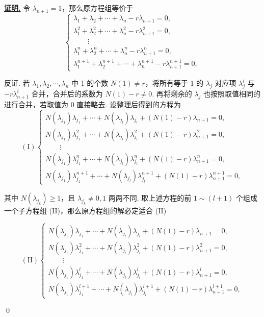 \documentclass[10pt,openany]{article}
\theoremstyle{thmstyle} %
\theoremstyle{defstyle} %
\theoremstyle{prostyle} %
\theoremstyle{exastyle}
\theoremstyle{remstyle}
\renewenvironment{proof}[1][证明]{\par\underline{\textbf{#1.}} \;\fangsong}{\qed\par}
\begin{document}
\begin{proof}
   令 \( \lambda_{n+1}=1 \)，那么原方程组等价于
   \[ \left\{ \begin{array}{l}
   	\lambda_1+\lambda_2+\cdots+\lambda_n-r\lambda_{n+1} = 0,\\
   	\lambda_1^{2}+\lambda_2^{2}+\cdots+\lambda_n^{2}-r\lambda_{n+1}^2 = 0,\\
   	\qquad \vdots\\
   	\lambda_1^{n}+\lambda_2^{n}+\cdots+\lambda_n^{n}-r\lambda_{n+1}^{n} = 0,\\
   	\lambda_1^{n+1}+\lambda_2^{n+1}+\cdots+\lambda_n^{n+1}-r\lambda_{n+1}^{n+1} = 0,
   \end{array}\right.\]
   
   反证. 若 \( \lambda_1,\lambda_2,\cdots,\lambda_n \) 中 1 的个数 \( N(1) \neq r \)，将所有等于 \( 1 \) 的 \( \lambda_j \) 对应项 \( \lambda_j^i \) 与 \( -r\lambda_{n+1}^{i} \) 合并，合并后的系数为 \( N(1)-r \neq 0 \). 再将剩余的 \( \lambda_j \) 也按照取值相同的进行合并，若取值为 \( 0 \) 直接略去. 设整理后得到的方程为
    \[ (\text{I}) \left\{ \begin{array}{l}
    	N(\lambda_{j_1}) \lambda_{j_1}+\cdots+N(\lambda_{j_l})\lambda_{j_l}+(N(1)-r)\lambda_{n+1} = 0,\\
    	N(\lambda_{j_1}) \lambda_{j_1}^{2}+\cdots+N(\lambda_{j_l})\lambda_{j_l}^{2}+(N(1)-r)\lambda_{n+1}^2 = 0,\\
    	\qquad \vdots\\
    	N(\lambda_{j_1}) \lambda_{j_1}^{n}+\cdots+N(\lambda_{j_l})\lambda_{j_l}^{n}+(N(1)-r)\lambda_{n+1}^{n} = 0,\\
    	N(\lambda_{j_1}) \lambda_{j_1}^{n+1}+\cdots+N(\lambda_{j_l})\lambda_{j_l}^{n+1}+(N(1)-r)\lambda_{n+1}^{n+1} = 0,
    \end{array}\right.\]
    
    其中 \( N(\lambda_{j_k}) \geq 1 \)，且 \( \lambda_{j_k} \neq 0,1 \) 两两不同. 取上述方程的前 \( 1 \sim (l+1) \) 个组成一个子方程组 (II)，那么原方程组的解必定适合 (II)
    
    \[ (\text{II}) \left\{ \begin{array}{l}
    	N(\lambda_{j_1}) \lambda_{j_1}+\cdots+N(\lambda_{j_l})\lambda_{j_l}+(N(1)-r)\lambda_{n+1} = 0,\\
    	N(\lambda_{j_1}) \lambda_{j_1}^{2}+\cdots+N(\lambda_{j_l})\lambda_{j_l}^{2}+(N(1)-r)\lambda_{n+1}^2 = 0,\\
    	\qquad \vdots\\
    	N(\lambda_{j_1}) \lambda_{j_1}^{l}+\cdots+N(\lambda_{j_l})\lambda_{j_l}^{l}+(N(1)-r)\lambda_{n+1}^{l} = 0,\\
    	N(\lambda_{j_1}) \lambda_{j_1}^{l+1}+\cdots+N(\lambda_{j_l})\lambda_{j_l}^{l+1}+(N(1)-r)\lambda_{n+1}^{l+1} = 0,
    \end{array}\right.\]
    

\end{proof}
\end{document}
